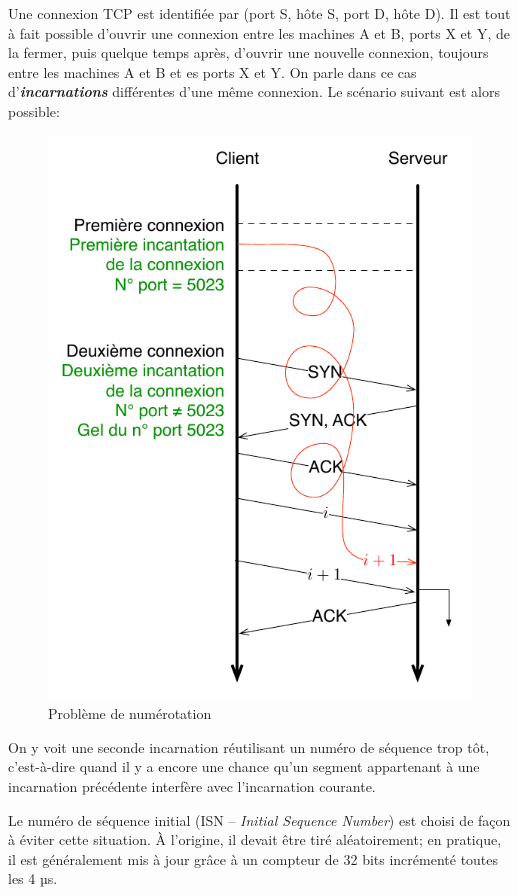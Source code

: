 \documentclass[11pt,english,french]{scrreprt}
\theoremstyle{remark}
\theoremstyle{definition}
\begin{document}
Une connexion TCP est identifiée par (port S, hôte S, port D, hôte D). Il est tout à fait possible d'ouvrir une connexion entre les machines A et B, ports X et Y, de la fermer, puis quelque temps après, d'ouvrir une nouvelle connexion, toujours entre les machines A et B et es ports X et Y. On parle dans ce cas d'\emph{\textbf{incarnations}} différentes d'une même connexion. Le scénario suivant est alors possible:
\begin{figure}[h!]
	\center
	\includegraphics[scale=.75]{graphes/TCP/Numero_sequence}
	\caption{Problème de numérotation}
\end{figure}

On y voit une seconde incarnation réutilisant un numéro de séquence trop tôt, c'est-à-dire quand il y a encore une chance qu'un segment appartenant à une incarnation précédente interfère avec l'incarnation courante.

Le numéro de séquence initial (ISN -- \emph{Initial Sequence Number}) est choisi de façon à éviter cette situation. À l'origine, il devait être tiré aléatoirement; en pratique, il est généralement mis à jour grâce à un compteur de 32 bits incrémenté toutes les 4 µs.
\newline
\end{document}
